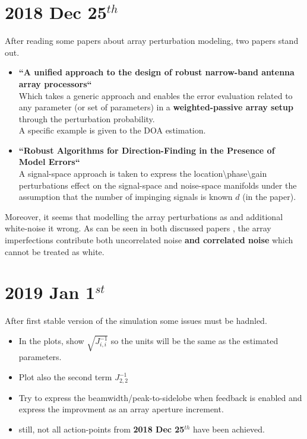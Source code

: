 \documentclass[12pt]{article}
\begin{document}
\section{2018 Dec 25$^{th}$}
After reading some papers about array perturbation modeling, two papers stand out.
\begin{itemize}
    \item \textbf{``A unified approach to the design of robust narrow-band antenna array processors``} \cite{Er2009AProcessors}\\
    Which takes a generic approach and enables the error evaluation related to any parameter (or set of parameters) in a \textbf{weighted-passive array setup} through the perturbation probability.\\
    A specific example is given to the DOA estimation.
    \item \textbf{``Robust Algorithms for Direction-Finding in the Presence of Model Errors``}\cite{SwindlehurstRobustErrors}\\
    A signal-space approach is taken to express the location\textbackslash phase\textbackslash gain perturbations effect on the signal-space and noise-space manifolds under the assumption that the number of impinging signals is known $d$ (in the paper).
\end{itemize}
Moreover, it seems that modelling the array perturbations as and additional white-noise it wrong. As can be seen in both discussed papers \cite{Er2009AProcessors,SwindlehurstRobustErrors}, the array imperfections contribute both uncorrelated noise \textbf{and correlated noise} which cannot be treated as white.
\section{2019 Jan 1$^{st}$}
After first stable version of the simulation some issues must be hadnled.
\begin{itemize}
    \item In the plots, show $\sqrt{J^{-1}_{i,i}}$ so the units will be the same as the estimated parameters.
    \item Plot also the second term $J^{-1}_{2,2}$
    \item Try to express the beamwidth/peak-to-sidelobe when feedback is enabled and express the improvment as an array aperture increment.
    \item still, not all action-points from \textbf{2018 Dec 25$^{th}$} have been achieved. 
\end{itemize}
\clearpage
\small
{


}
\end{document}
